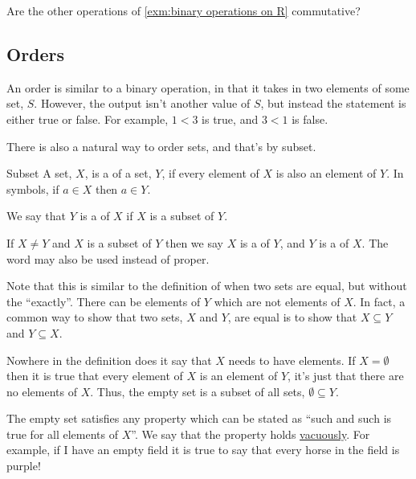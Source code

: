 \documentclass[fleqn]{LectureClass/LectureClass}
\begin{document}
    \begin{problem}{}{}
        Are the other operations of \cref{exm:binary operations on R} commutative?
    \end{problem}
    
    \subsection{Orders}
    An order is similar to a binary operation, in that it takes in two elements of some set, \(S\).
    However, the output isn't another value of \(S\), but instead the statement is either true or false.
    For example, \(1 < 3\) is true, and \(3 < 1\) is false.
    
    There is also a natural way to order sets, and that's by subset.
    
    \begin{dfn}{Subset}{}
        A set, \(X\), is a  of a set, \(Y\), if every element of \(X\) is also an element of \(Y\).
        In symbols, if \(a \in X\) then \(a \in Y\).
        
        We say that \(Y\) is a  of \(X\) if \(X\) is a subset of \(Y\).
        
        If \(X \ne Y\) and \(X\) is a subset of \(Y\) then we say \(X\) is a  of \(Y\), and \(Y\) is a  of \(X\).
        The word  may also be used instead of proper.
    \end{dfn}
    
    Note that this is similar to the definition of when two sets are equal, but without the \enquote{exactly}.
    There can be elements of \(Y\) which are not elements of \(X\).
    In fact, a common way to show that two sets, \(X\) and \(Y\), are equal is to show that \(X \subseteq Y\) and \(Y \subseteq X\).
    
    Nowhere in the definition does it say that \(X\) needs to have elements.
    If \(X = \emptyset\) then it is true that every element of \(X\) is an element of \(Y\), it's just that there are no elements of \(X\).
    Thus, the empty set is a subset of all sets, \(\emptyset \subseteq Y\).
    
    \begin{remark}{}{}
        The empty set satisfies any property which can be stated as \enquote{such and such is true for all elements of \(X\)}.
        We say that the property holds \href{https://en.wikipedia.org/wiki/Vacuous_truth}{vacuously}.
        For example, if I have an empty field it is true to say that every horse in the field is purple!
    \end{remark}
    
\end{document}
